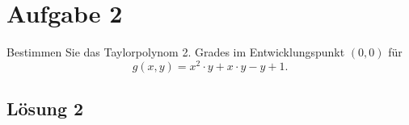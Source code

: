 \documentclass[main.tex]{subfiles}
\begin{document}
\section{Aufgabe 2}
Bestimmen Sie das Taylorpolynom 2. Grades im Entwicklungspunkt $(0,0)$ für
$$
    g(x,y) = x^2\cdot y + x\cdot y - y + 1.
$$


\subsection{Lösung 2}
\end{document}
